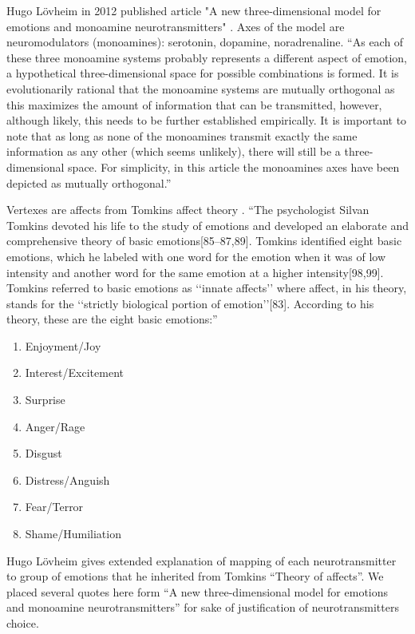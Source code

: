 Hugo L\"{o}vheim in 2012 published article "A new three-dimensional model for emotions and monoamine neurotransmitters" \cite{cubeofemotions}. Axes of the model are neuromodulators (monoamines): serotonin, dopamine, noradrenaline. ``As each of these three monoamine systems probably represents a different aspect of emotion, a hypothetical three-dimensional space for possible combinations is formed. It is evolutionarily rational that the monoamine systems are mutually orthogonal as this maximizes the amount of information that can be transmitted, however, although likely, this needs to be further established empirically. It is important to note that as long as none of the monoamines transmit exactly the same information as any other (which seems unlikely), there will still be a three-dimensional space. For simplicity, in this article the monoamines axes have been depicted as mutually orthogonal.''

Vertexes are affects from Tomkins affect theory \cite{primer_affect_psychology}. ``The psychologist Silvan Tomkins devoted his life to the study of emotions and developed an elaborate and comprehensive theory of basic emotions[85–87,89]. Tomkins identified eight basic emotions, which he labeled with one word for the emotion when it was of low intensity and another word for the same emotion at a higher intensity[98,99]. Tomkins referred to basic emotions as ‘‘innate affects’’ where affect, in his theory, stands for the ‘‘strictly biological portion of emotion’’[83]. According to his theory, these are the eight basic emotions:''

\begin{enumerate}
 \item  Enjoyment/Joy
 \item  Interest/Excitement
 \item  Surprise
 \item  Anger/Rage
 \item  Disgust
 \item  Distress/Anguish
 \item  Fear/Terror
 \item  Shame/Humiliation
\end{enumerate}

Hugo L\"{o}vheim gives extended explanation of mapping of each neurotransmitter to group of emotions that he inherited from Tomkins ``Theory of affects''. We placed several quotes here form ``A new three-dimensional model for emotions and monoamine neurotransmitters'' \cite{cubeofemotions} for sake of justification of neurotransmitters choice.


